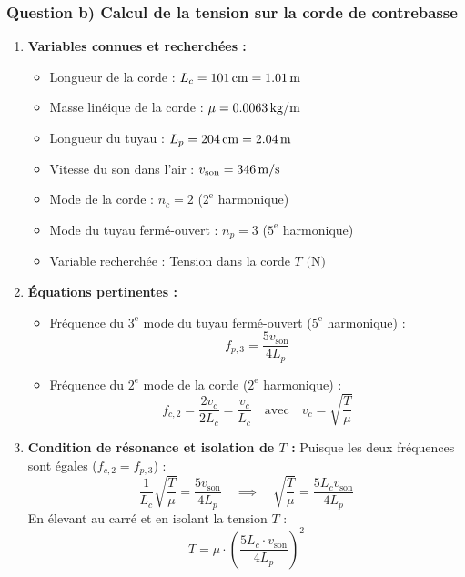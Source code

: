 \subsubsection*{Question b) Calcul de la tension sur la corde de contrebasse}

\begin{enumerate}[label=\arabic*)]
    \item \textbf{Variables connues et recherchées :}
    \begin{itemize}[label= -]
        \item Longueur de la corde : $L_c = \qty{\CordeLongueur}{cm} = \qty{\fpeval{\CordeLongueur/100}}{m}$
        \item Masse linéique de la corde : $\mu = \qty{0.0063}{kg/m}$
        \item Longueur du tuyau : $L_p = \qty{\TuyauLongueur}{cm} = \qty{\fpeval{\TuyauLongueur/100}}{m}$
        \item Vitesse du son dans l'air : $v_{\text{son}} = \qty{346}{m/s}$
        \item Mode de la corde : $n_c = 2$ ($2^\text{e}$ harmonique)
        \item Mode du tuyau fermé-ouvert : $n_p = 3$ ($5^\text{e}$ harmonique)
        \item Variable recherchée : Tension dans la corde $T \text{ (N)}$
    \end{itemize}

    \item \textbf{Équations pertinentes :}
    \begin{itemize}[label= -]
        \item Fréquence du $3^\text{e}$ mode du tuyau fermé-ouvert ($5^\text{e}$ harmonique) :
        \[
        f_{p, 3} = \frac{5 v_{\text{son}}}{4 L_p}
        \]
        \item Fréquence du $2^\text{e}$ mode de la corde ($2^\text{e}$ harmonique) :
        \[
        f_{c, 2} = \frac{2 v_c}{2 L_c} = \frac{v_c}{L_c} \quad \text{avec} \quad v_c = \sqrt{\frac{T}{\mu}}
        \]
    \end{itemize}

    \item \textbf{Condition de résonance et isolation de $T$ :}
    Puisque les deux fréquences sont égales ($f_{c, 2} = f_{p, 3}$) :
    \[
    \frac{1}{L_c} \sqrt{\frac{T}{\mu}} = \frac{5 v_{\text{son}}}{4 L_p} \quad \implies \quad \sqrt{\frac{T}{\mu}} = \frac{5 L_c v_{\text{son}}}{4 L_p}
    \]
    En élevant au carré et en isolant la tension $T$ :
    \[
    T = \mu \cdot \left( \frac{5 L_c \cdot v_{\text{son}}}{4 L_p} \right)^2
    \]


\end{enumerate}
